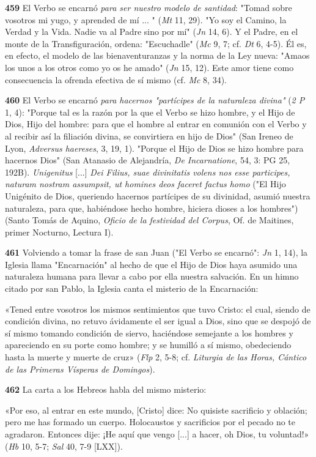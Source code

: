 \documentclass[]{article}
\begin{document}
\textbf{459} El Verbo se encarnó \emph{para ser nuestro modelo de
santidad}: "Tomad sobre vosotros mi yugo, y aprended de mí ... "
(\emph{Mt} 11, 29). "Yo soy el Camino, la Verdad y la Vida. Nadie va al
Padre sino por mí" (\emph{Jn} 14, 6). Y el Padre, en el monte de la
Transfiguración, ordena: "Escuchadle" (\emph{Mc} 9, 7; cf. \emph{Dt} 6,
4-5). Él es, en efecto, el modelo de las bienaventuranzas y la norma de
la Ley nueva: "Amaos los unos a los otros como yo os he amado"
(\emph{Jn} 15, 12). Este amor tiene como consecuencia la ofrenda
efectiva de sí mismo (cf. \emph{Mc} 8, 34).

\textbf{460} El Verbo se encarnó \emph{para hacernos "partícipes de la
naturaleza divina"} (\emph{2 P} 1, 4): "Porque tal es la razón por la
que el Verbo se hizo hombre, y el Hijo de Dios, Hijo del hombre: para
que el hombre al entrar en comunión con el Verbo y al recibir así la
filiación divina, se convirtiera en hijo de Dios" (San Ireneo de Lyon,
\emph{Adversus haereses}, 3, 19, 1). "Porque el Hijo de Dios se hizo
hombre para hacernos Dios" (San Atanasio de Alejandría, \emph{De
Incarnatione}, 54, 3: PG 25, 192B). \emph{Unigenitus} {[}...{]}
\emph{Dei Filius, suae divinitatis volens nos esse participes, naturam
nostram assumpsit, ut homines deos faceret factus homo} ("El Hijo
Unigénito de Dios, queriendo hacernos partícipes de su divinidad, asumió
nuestra naturaleza, para que, habiéndose hecho hombre, hiciera dioses a
los hombres") (Santo Tomás de Aquino, \emph{Oficio de la festividad del
Corpus}, Of. de Maitines, primer Nocturno, Lectura I).

\textbf{461} Volviendo a tomar la frase de san Juan ("El Verbo se
encarnó": \emph{Jn} 1, 14), la Iglesia llama "Encarnación" al hecho de
que el Hijo de Dios haya asumido una naturaleza humana para llevar a
cabo por ella nuestra salvación. En un himno citado por san Pablo, la
Iglesia canta el misterio de la Encarnación:

«Tened entre vosotros los mismos sentimientos que tuvo Cristo: el cual,
siendo de condición divina, no retuvo ávidamente el ser igual a Dios,
sino que se despojó de sí mismo tomando condición de siervo, haciéndose
semejante a los hombres y apareciendo en su porte como hombre; y se
humilló a sí mismo, obedeciendo hasta la muerte y muerte de cruz»
(\emph{Flp} 2, 5-8; cf. \emph{Liturgia de las Horas, Cántico de las
Primeras Vísperas de Domingos}).

\textbf{462} La carta a los Hebreos habla del mismo misterio:

«Por eso, al entrar en este mundo, {[}Cristo{]} dice: No quisiste
sacrificio y oblación; pero me has formado un cuerpo. Holocaustos y
sacrificios por el pecado no te agradaron. Entonces dije: ¡He aquí que
vengo {[}...{]} a hacer, oh Dios, tu voluntad!» (\emph{Hb} 10, 5-7;
\emph{Sal} 40, 7-9 {[}LXX{]}).
\end{document}
